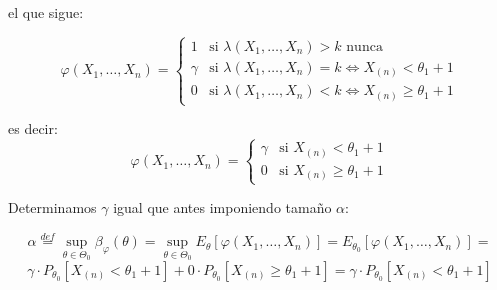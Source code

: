 \documentclass[12pt]{article}
\begin{document}
\begin{ejercicio}[2 puntos]
\begin{figure}[H]
        \end{figure}

        el que sigue:

        $$\varphi(X_1, \ldots, X_n) = \begin{cases}
            1 &\text{si } \lambda(X_1, \ldots, X_n) > k \text{ nunca} \\
            \gamma &\text{si } \lambda(X_1, \ldots, X_n) = k \iff X_{(n)} < \theta_1 + 1 \\
            0 &\text{si } \lambda(X_1, \ldots, X_n) < k \iff X_{(n)} \geq \theta_1 + 1
        \end{cases}$$

        es decir:
        $$\varphi(X_1, \ldots, X_n) = \begin{cases}
            \gamma &\text{si } X_{(n)} < \theta_1 + 1 \\
            0 &\text{si } X_{(n)} \geq \theta_1 + 1
        \end{cases}$$

        Determinamos $\gamma$ igual que antes imponiendo tamaño $\alpha$:

        $$\alpha \stackrel{def} = \sup_{\theta \in \Theta_0} \beta_{\varphi}(\theta) =  \sup_{\theta \in \Theta_0} E_\theta[\varphi(X_1, \ldots, X_n)] = E_{\theta_0}[\varphi(X_1, \ldots, X_n)] = $$
        $$\gamma \cdot P_{\theta_0}[X_{(n)} < \theta_1 + 1] + 0 \cdot P_{\theta_0}[X_{(n)} \geq \theta_1 + 1] = \gamma \cdot P_{\theta_0}[X_{(n)} < \theta_1 + 1] $$


\end{ejercicio}
\end{document}
